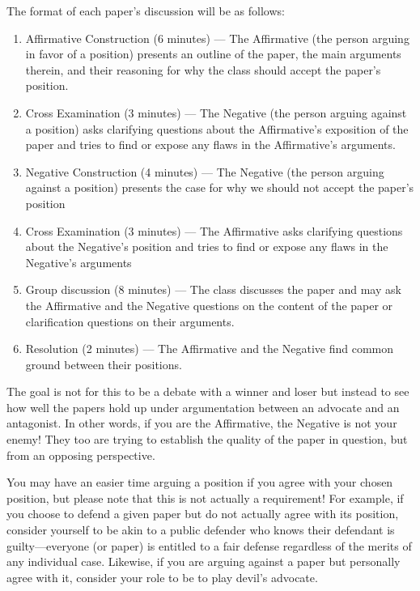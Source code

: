 \documentclass[11pt]{article}
\begin{document}
\noindent The format of each paper's discussion will be as follows:
\begin{enumerate}
    \item Affirmative Construction (6 minutes) --- The Affirmative (the person arguing in favor of a position) presents an outline of the paper, the main arguments therein, and their reasoning for why the class should accept the paper's position. 
    \item Cross Examination (3 minutes) --- The Negative (the person arguing against a position) asks clarifying questions about the Affirmative's exposition of the paper and tries to find or expose any flaws in the Affirmative's arguments. 
    \item Negative Construction (4 minutes) --- The Negative (the person arguing against a position) presents the case for why we should not accept the paper's position
    \item Cross Examination (3 minutes) --- The Affirmative asks clarifying questions about the Negative's position and tries to find or expose any flaws in the Negative's arguments
    \item Group discussion (8 minutes) --- The class discusses the paper and may ask the Affirmative and the Negative questions on the content of the paper or clarification questions on their arguments. 
    \item Resolution (2 minutes) --- The Affirmative and the Negative find common ground between their positions. 
\end{enumerate}

The goal is not for this to be a debate with a winner and loser but instead to see how well the papers hold up under argumentation between an advocate and an antagonist.
In other words, if you are the Affirmative, the Negative is not your enemy!
They too are trying to establish the quality of the paper in question, but from an opposing perspective.

You may have an easier time arguing a position if you agree with your chosen position, but please note that this is not actually a requirement!
For example, if you choose to defend a given paper but do not actually agree with its position, consider yourself to be akin to a public defender who knows their defendant is guilty---everyone (or paper) is entitled to a fair defense regardless of the merits of any individual case. 
Likewise, if you are arguing against a paper but personally agree with it, consider your role to be to play devil's advocate.
\end{document}
